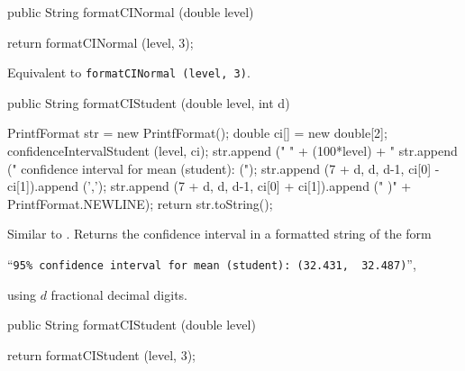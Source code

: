 \begin{htmlonly}
\end{htmlonly}
\begin{code}

   public String formatCINormal (double level) \begin{hide} {
      return formatCINormal (level, 3);
   }\end{hide}
\end{code}
\begin{tabb}   Equivalent to \texttt{formatCINormal (level, 3)}.
\end{tabb}
\begin{htmlonly}
\end{htmlonly}
\begin{code}

   public String formatCIStudent (double level, int d) \begin{hide} {
      PrintfFormat str = new PrintfFormat();
      double ci[] = new double[2];
      confidenceIntervalStudent (level, ci);
      str.append ("  " + (100*level) + "%
      str.append (" confidence interval for mean (student): (");
      str.append (7 + d, d, d-1, ci[0] - ci[1]).append (',');
      str.append (7 + d, d, d-1, ci[0] + ci[1]).append (" )" + PrintfFormat.NEWLINE);
      return str.toString();
   }\end{hide}
\end{code}
  \begin{tabb}  Similar to .
   Returns the confidence interval in a formatted string of the form\\
  \centerline{``\texttt{95\% confidence interval for mean (student): (32.431,\, 32.487)}'',}
   using $d$ fractional decimal digits.
\end{tabb}
\begin{htmlonly}
\end{htmlonly}
\begin{code}

   public String formatCIStudent (double level) \begin{hide} {
      return formatCIStudent (level, 3);
   }\end{hide}
\end{code}
